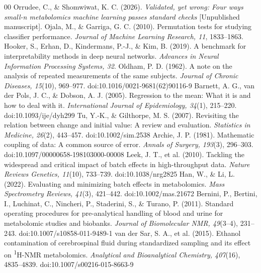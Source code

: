 \documentclass[11pt,a4paper]{article}
\begin{document}
\renewcommand{\refname}{เอกสารอ้างอิง}
\begingroup
\small
\begin{thebibliography}{00}
\setlength{\itemsep}{0pt}\setlength{\parsep}{0pt}
 Orrudee, C., \& Shomwiwat, K. C. (2026). \textit{Validated, yet wrong: Four ways small-n metabolomics machine learning passes standard checks} [Unpublished manuscript].
 Ojala, M., \& Garriga, G. C. (2010). Permutation tests for studying classifier performance. \textit{Journal of Machine Learning Research, 11}, 1833--1863.
 Hooker, S., Erhan, D., Kindermans, P.-J., \& Kim, B. (2019). A benchmark for interpretability methods in deep neural networks. \textit{Advances in Neural Information Processing Systems, 32}.
 Oldham, P. D. (1962). A note on the analysis of repeated measurements of the same subjects. \textit{Journal of Chronic Diseases, 15}(10), 969--977. doi:10.1016/0021-9681(62)90116-9
 Barnett, A. G., van der Pols, J. C., \& Dobson, A. J. (2005). Regression to the mean: What it is and how to deal with it. \textit{International Journal of Epidemiology, 34}(1), 215--220. doi:10.1093/ije/dyh299
 Tu, Y.-K., \& Gilthorpe, M. S. (2007). Revisiting the relation between change and initial value: A review and evaluation. \textit{Statistics in Medicine, 26}(2), 443--457. doi:10.1002/sim.2538
 Archie, J. P. (1981). Mathematic coupling of data: A common source of error. \textit{Annals of Surgery, 193}(3), 296--303. doi:10.1097/00000658-198103000-00008
 Leek, J. T., et al. (2010). Tackling the widespread and critical impact of batch effects in high-throughput data. \textit{Nature Reviews Genetics, 11}(10), 733--739. doi:10.1038/nrg2825
 Han, W., \& Li, L. (2022). Evaluating and minimizing batch effects in metabolomics. \textit{Mass Spectrometry Reviews, 41}(3), 421--442. doi:10.1002/mas.21672
 Bernini, P., Bertini, I., Luchinat, C., Nincheri, P., Staderini, S., \& Turano, P. (2011). Standard operating procedures for pre-analytical handling of blood and urine for metabolomic studies and biobanks. \textit{Journal of Biomolecular NMR, 49}(3--4), 231--243. doi:10.1007/s10858-011-9489-1
 van der Sar, S. A., et al. (2015). Ethanol contamination of cerebrospinal fluid during standardized sampling and its effect on \textsuperscript{1}H-NMR metabolomics. \textit{Analytical and Bioanalytical Chemistry, 407}(16), 4835--4839. doi:10.1007/s00216-015-8663-9

\end{thebibliography}
\end{document}
